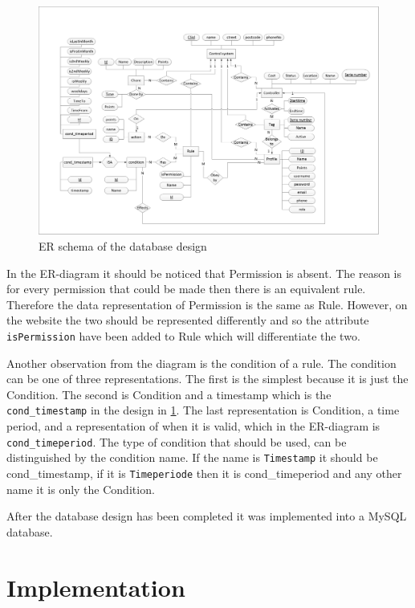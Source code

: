 \begin{figure}
	\centering
		\includegraphics[width=1.50\textwidth,  angle=90]{images/ERdiagram.jpg}
	\caption{ER schema of the database design}
	\label{fig:ERdiagram}
\end{figure}

In the ER-diagram it should be noticed that Permission is absent. The reason is for every permission that could be made then there is an equivalent rule. Therefore the data representation of Permission is the same as Rule. However, on the website the two should be represented differently and so the attribute \texttt{isPermission} have been added to Rule which will differentiate the two.

Another observation from the diagram is the condition of a rule. The condition can be one of three representations. The first is the simplest because it is just the Condition. The second is Condition and a timestamp which is the \texttt{cond\_timestamp} in the design in \ref{fig:ERdiagram}. The last representation is Condition, a time period, and a representation of when it is valid, which in the ER-diagram is \texttt{cond\_timeperiod}. 
 The type of condition that should be used, can be distinguished by the condition name. If the name is \texttt{Timestamp} it should be cond\_timestamp, if it is \texttt{Timeperiode} then it is cond\_timeperiod and any other name it is only the Condition. 

After the database design has been completed it was implemented into a MySQL database.  

\section{Implementation}

